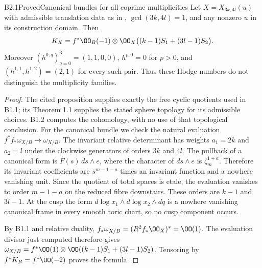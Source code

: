 \begin{claim}{B2.1}{Proved}{Canonical bundles for all coprime multiplicities}
Let $X=X_{3k,4l}(u)$ with admissible translation data as in
\citet[Theorem 1.1 and Proposition 2.3]{ViaclovskyLog2026},
$\gcd(3k,4l)=1$, and any nonzero $u$ in its construction domain.
Then
\[
K_X=f^*\OO_B(-1)\otimes
\OO_X\bigl((k-1)S_1+(3l-1)S_2\bigr).
\]
Moreover $(h^{0,q})_{q=0}^3=(1,1,0,0)$, $h^{p,0}=0$ for $p>0$,
and $(h^{1,1},h^{1,2})=(2,1)$ for every such pair.
Thus these Hodge numbers do not distinguish the multiplicity families.
\end{claim}
\begin{proof}
The cited proposition supplies exactly the free cyclic quotients used
in B1.1; its Theorem 1.1 supplies the stated sphere topology for its
admissible choices. B1.2 computes the cohomology, with no use of that
topological conclusion.
For the canonical bundle we check the natural evaluation
$f^*f_*\omega_{X/B}\to\omega_{X/B}$.
The invariant relative determinant has weights $a_1=2k$ and $a_2=l$
under the clockwise generators of orders $3k$ and $4l$. The pullback
of a canonical form is $F(s)\,ds\wedge e$, where the character of
$ds\wedge e$ is $\zeta_m^{1+a}$. Therefore its invariant coefficients
are $s^{m-1-a}$ times an invariant function and a nowhere vanishing
unit. Since the quotient of total spaces is etale, the evaluation
vanishes to order $m-1-a$ on the reduced fibre downstairs. These orders
are $k-1$ and $3l-1$. At the cusp the form
$d\log x_1\wedge d\log x_2\wedge dq$ is a nowhere vanishing canonical
frame in every smooth toric chart, so no cusp component occurs.

By B1.1 and relative duality,
$f_*\omega_{X/B}=(R^2f_*\OO_X)^*=\OO(1)$.
The evaluation divisor just computed therefore gives
$\omega_{X/B}=f^*\OO(1)\otimes
\OO((k-1)S_1+(3l-1)S_2)$. Tensoring by $f^*K_B=f^*\OO(-2)$
proves the formula.
\end{proof}
